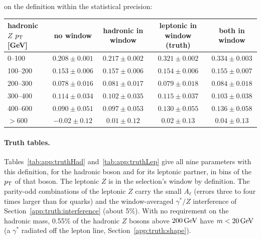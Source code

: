on the definition within the statistical precision:
\begin{center}
\footnotesize
\begin{tabular}{lcccc}
\toprule
hadronic $Z$ $p_{\mathrm{T}}$ [GeV] & no window & hadronic in window & leptonic in window (truth) & both in window \\
\midrule
0--100 & $0.208 \pm 0.001$ & $0.217 \pm 0.002$ & $0.321 \pm 0.002$ & $0.334 \pm 0.003$ \\
100--200 & $0.153 \pm 0.006$ & $0.157 \pm 0.006$ & $0.154 \pm 0.006$ & $0.155 \pm 0.007$ \\
200--300 & $0.078 \pm 0.016$ & $0.081 \pm 0.017$ & $0.079 \pm 0.018$ & $0.084 \pm 0.018$ \\
300--400 & $0.114 \pm 0.034$ & $0.102 \pm 0.035$ & $0.115 \pm 0.037$ & $0.103 \pm 0.038$ \\
400--600 & $0.090 \pm 0.051$ & $0.097 \pm 0.053$ & $0.130 \pm 0.055$ & $0.136 \pm 0.058$ \\
$> 600$ & $-0.02 \pm 0.12$ & $0.01 \pm 0.12$ & $0.02 \pm 0.13$ & $0.04 \pm 0.13$ \\
\bottomrule
\end{tabular}
\end{center}

\paragraph{Truth tables.} Tables~\ref{tab:app:truthHad} and~\ref{tab:app:truthLep} give all nine parameters with this
definition, for the hadronic boson and for its leptonic partner, in bins of the $p_{\mathrm{T}}$ of that boson. The leptonic $Z$
is in the selection's window by definition. The parity-odd combinations of the leptonic $Z$ carry the small $A_\ell$
(errors three to four times larger than for quarks) and the window-averaged $\gamma^*/Z$ interference of
Section~\ref{app:truth:interference} (about 5\%). With no requirement on the hadronic mass, 0.55\% of the hadronic
$Z$ bosons above $200\,\mathrm{GeV}$ have $m < 20\,\mathrm{GeV}$ (a $\gamma^*$ radiated off the lepton line,
Section~\ref{app:truth:shape}).

